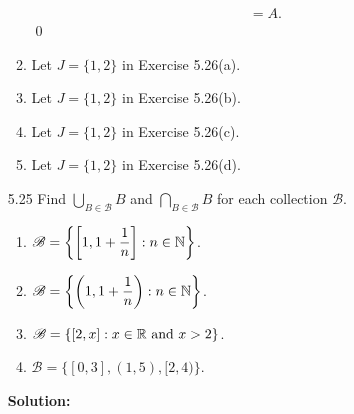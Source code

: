 \begin{enumerate}
\begin{enumerate}
\begin{align*}
                     &= A.
               \end{align*} \qed
         \item Let $J = \{1, 2\}$ in Exercise 5.26(a).
         \item Let $J = \{1, 2\}$ in Exercise 5.26(b).
         \item Let $J = \{1, 2\}$ in Exercise 5.26(c).
         \item Let $J = \{1, 2\}$ in Exercise 5.26(d).
      \end{enumerate}
   \item[5.25] Find $\bigcup_{B \in\mathscr{B}}B$ and
               $\bigcap_{B \in\mathscr{B}}B$ for each collection $\mathscr{B}$.
               \begin{enumerate}
                  \item $\displaystyle\mathscr{B} = \left\{\left[1, 1 +
                         \frac{1}{n}\right] : n \in \mathbb{N}\right\}$.
                  \item $\displaystyle\mathscr{B} = \left\{\left(1, 1 +
                         \frac{1}{n}\right) : n \in \mathbb{N}\right\}$.
                  \item $\mathscr{B} = \{[2, x]: x \in \mathbb{R} \text{ and } x > 2\}$.
                  \item $\mathscr{B} = \{[0, 3], (1, 5), [2, 4)\}$.
               \end{enumerate}

      \textbf{Solution:}


\end{enumerate}
